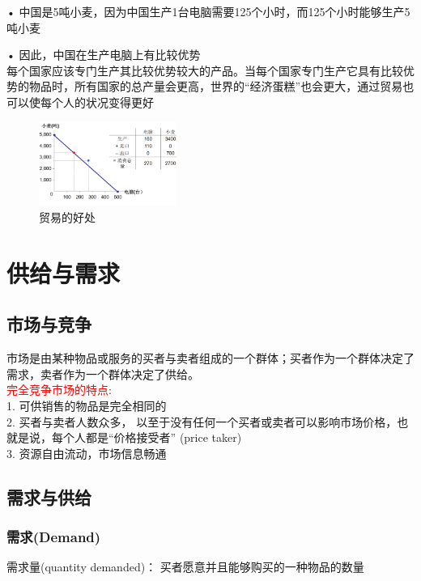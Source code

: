 \documentclass[12pt,a4paper]{article}
\begin{document}
• 中国是5吨小麦，因为中国生产1台电脑需要125个小时，而125个小时能够生产5吨小麦

• 因此，中国在生产电脑上有比较优势\\

每个国家应该专门生产其比较优势较大的产品。当每个国家专门生产它具有比较优势的物品时，所有国家的总产量会更高，世界的“经济蛋糕”也会更大，通过贸易也可以使每个人的状况变得更好

\begin{figure}[H] 
  \centering %
  \includegraphics[width=0.4\textwidth]{贸易的好处.png} %
  \caption{贸易的好处} %
\end{figure}


\section{供给与需求}
\subsection{市场与竞争}
市场是由某种物品或服务的买者与卖者组成的一个群体；买者作为一个群体决定了需求，卖者作为一个群体决定了供给。\\

\textcolor{red}{完全竞争市场的特点}:\\
1. 可供销售的物品是完全相同的\\
2. 买者与卖者人数众多， 以至于没有任何一个买者或卖者可以影响市场价格，也就是说，每个人都是“价格接受者” (price taker)\\
3. 资源自由流动，市场信息畅通\\

\subsection{需求与供给}
\subsubsection{需求(Demand)}
需求量(quantity demanded)： 买者愿意并且能够购买的一种物品的数量\\ 
\end{document}
